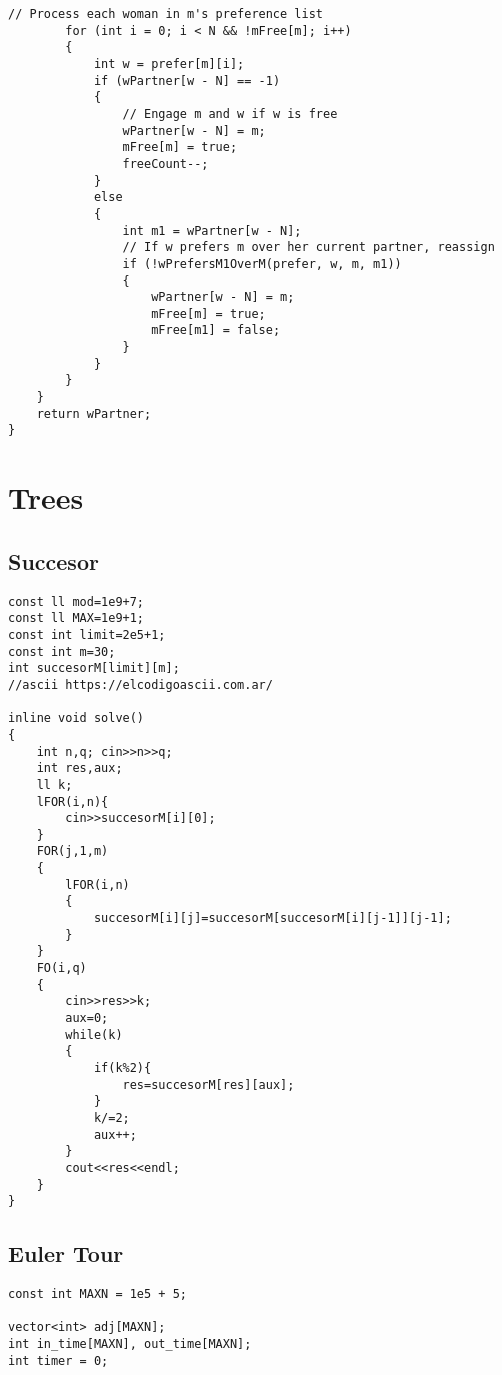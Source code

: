 \documentclass[10pt]{article}
\begin{document}
\begin{multicols*}{2}
\begin{lstlisting}[style=compactcpp]
        // Process each woman in m's preference list
        for (int i = 0; i < N && !mFree[m]; i++)
        {
            int w = prefer[m][i];
            if (wPartner[w - N] == -1)
            {
                // Engage m and w if w is free
                wPartner[w - N] = m;
                mFree[m] = true;
                freeCount--;
            }
            else
            {
                int m1 = wPartner[w - N];
                // If w prefers m over her current partner, reassign
                if (!wPrefersM1OverM(prefer, w, m, m1))
                {
                    wPartner[w - N] = m;
                    mFree[m] = true;
                    mFree[m1] = false;
                }
            }
        }
    }
    return wPartner;
}
\end{lstlisting}

\section{Trees}

\subsection{Succesor}

\begin{lstlisting}[style=compactcpp]
const ll mod=1e9+7;
const ll MAX=1e9+1;
const int limit=2e5+1;
const int m=30;
int succesorM[limit][m];
//ascii https://elcodigoascii.com.ar/

inline void solve()
{
    int n,q; cin>>n>>q;
    int res,aux;
    ll k;
    lFOR(i,n){
        cin>>succesorM[i][0];
    }
    FOR(j,1,m)
    {
        lFOR(i,n)
        {
            succesorM[i][j]=succesorM[succesorM[i][j-1]][j-1];
        }
    }
    FO(i,q)
    {
        cin>>res>>k;
        aux=0;
        while(k)
        {
            if(k%2){
                res=succesorM[res][aux];
            }
            k/=2;
            aux++;
        }
        cout<<res<<endl;
    }
}
\end{lstlisting}

\subsection{Euler Tour}

\begin{lstlisting}[style=compactcpp]
const int MAXN = 1e5 + 5;

vector<int> adj[MAXN];
int in_time[MAXN], out_time[MAXN];
int timer = 0;


\end{lstlisting}
\end{multicols*}
\end{document}
